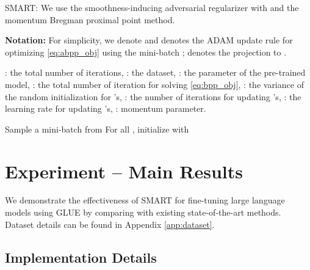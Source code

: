 \documentclass[11pt]{article} \usepackage{url}
\begin{document}
\begin{algorithm}[!tb]
\caption{SMART: We use the smoothness-inducing adversarial regularizer with  and the momentum Bregman proximal point method.
}\label{algo:main}
\begin{algorithmic}[1]
    \item[\textbf{Notation:}] For simplicity, we denote  and  denotes the ADAM update rule for optimizing \eqref{eq:abpp_obj} using the mini-batch ;  denotes the projection to .
    
	\INPUT : the total number of iterations, : the dataset, : the parameter of the pre-trained model, : the total number of iteration for solving \eqref{eq:bpp_obj}, : the variance of the random initialization for 's, : the number of iterations for updating 's, : the learning rate for updating 's, : momentum parameter.

	\State 
	\For{}
	\State 
	\For{}
	    \State Sample a mini-batch  from 
	    \State For all , initialize  with 
    	\For{}
    	    \State 
    	    \State  
    	\EndFor
\State   \EndFor
	\State 
	\State 
	\EndFor
		\OUTPUT 
\end{algorithmic}
\end{algorithm}

 

\vspace{-0.075in}
\section{Experiment -- Main Results}
\label{sec:exp}
\vspace{-0.05in}

We demonstrate the effectiveness of SMART for fine-tuning large language models using GLUE \cite{wang2018glue} by comparing with existing state-of-the-art methods. Dataset details can be found in Appendix \ref{app:dataset}.


\vspace{-0.1in}
\subsection{Implementation Details}
\label{subsec:impl}
\vspace{-0.05in}
\end{document}
